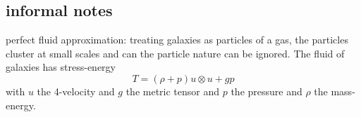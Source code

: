 \subsection{informal notes}
perfect fluid approximation: treating galaxies as particles of a gas, the particles cluster at small scales and can the particle nature can be ignored. The fluid of galaxies has stress-energy 
\begin{equation*}
    T = (\rho+p) u\otimes u + gp
\end{equation*}
with $u$ the 4-velocity and $g$ the metric tensor and $p$ the pressure and $\rho$ the mass-energy.
